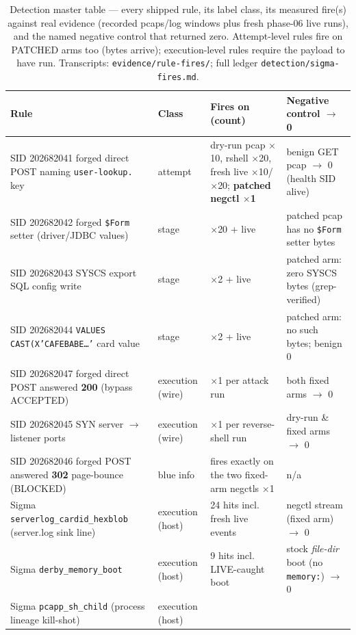\documentclass[journal]{IEEEtran}
\begin{document}
\begin{table}[t]
\centering
\caption{Detection master table — every shipped rule, its label class, its
measured fire(s) against real evidence (recorded pcaps/log windows plus fresh
phase-06 live runs), and the named negative control that returned zero.
Attempt-level rules fire on PATCHED arms too (bytes arrive); execution-level
rules require the payload to have run. Transcripts:
\texttt{evidence/rule-fires/}; full ledger \texttt{detection/sigma-fires.md}.}
\label{tab:detect}
\footnotesize
\begin{tabular}{p{}p{}p{}p{}}
\toprule
Rule & Class & Fires on (count) & Negative control $\rightarrow$ 0 \\
\midrule
SID 202682041 forged direct POST naming \texttt{user-lookup.} key & attempt &
dry-run pcap $\times$10, rshell $\times$20, fresh live $\times$10/$\times$20;
\textbf{patched negctl $\times$1} & benign GET pcap $\rightarrow$ 0 (health SID
alive) \\
SID 202682042 forged \texttt{\$Form} setter (driver/JDBC values) & stage &
$\times$20 + live & patched pcap has no \texttt{\$Form} setter bytes \\
SID 202682043 SYSCS export SQL config write & stage & $\times$2 + live &
patched arm: zero SYSCS bytes (grep-verified) \\
SID 202682044 \texttt{VALUES CAST(X'CAFEBABE\ldots'} card value & stage &
$\times$2 + live & patched arm: no such bytes; benign 0 \\
SID 202682047 forged direct POST answered \textbf{200} (bypass ACCEPTED) & execution (wire) &
$\times$1 per attack run & both fixed arms $\to$ 0 \\
SID 202682045 SYN server $\rightarrow$ listener ports & execution (wire) &
$\times$1 per reverse-shell run & dry-run \& fixed arms $\rightarrow$ 0 \\
SID 202682046 forged POST answered \textbf{302} page-bounce (BLOCKED) & blue info &
fires exactly on the two fixed-arm negctls $\times$1 & n/a \\
Sigma \texttt{serverlog\_\allowbreak cardid\_\allowbreak hexblob} (server.log sink line) & execution (host) &
24 hits incl. fresh live events & negctl stream (fixed arm) $\to$ 0 \\
Sigma \texttt{derby\_memory\_boot} & execution (host) & 9 hits incl. LIVE-caught boot &
stock \emph{file-dir} boot (no \texttt{memory:}) $\to$ 0 \\
Sigma \texttt{pcapp\_sh\_child} (process lineage kill-shot) & execution (host) &

\end{tabular}
\end{table}
\end{document}
